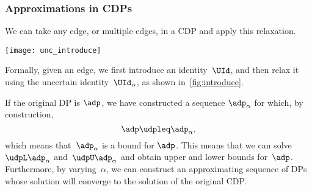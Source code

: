 \vfill\pagebreak

\subsubsection{Approximations in CDPs}

We can take any edge, or multiple edges, in a CDP and apply this relaxation.

\begin{marginfigure}
    \texttt{[image: unc\_introduce]}
    \caption{}
    \label{fig:introduce}
\end{marginfigure}

Formally, given an edge, we first introduce an identity~$\UId$, and then relax it using the uncertain identity~$\UId_{\alpha}$,
as shown in~\cref{fig:introduce}.

If the original DP is $\adp$, we have constructed a sequence $\adp_\alpha$ for which, by construction,
%
\begin{equation}
    \adp\udpleq\adp_{\alpha},
\end{equation}
%
which means that~$\adp_{\alpha}$ is a bound for  $\adp$.
This means that we can solve~$\udpL\adp_{\alpha}$ and~$\udpU\adp_{\alpha}$ and obtain upper and lower bounds for~$\adp$.
Furthermore, by varying~$\alpha$, we can construct an approximating sequence of DPs whose solution will converge to the solution of the original CDP.

%

